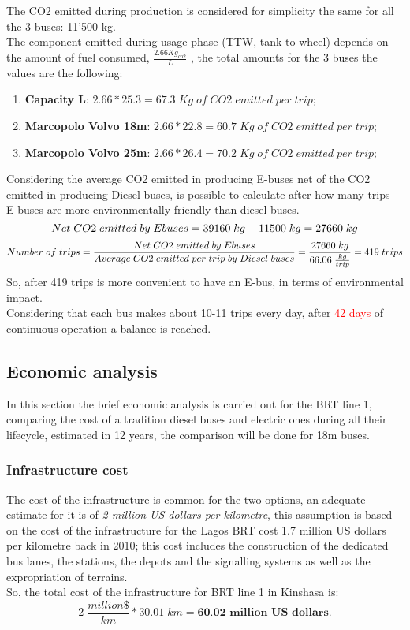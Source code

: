 \documentclass{article}
\begin{document}
The CO2 emitted during production is considered for simplicity the same for all the 3 buses: 11'500 kg.\\
The component emitted during usage phase (TTW, tank to wheel) depends on the amount of fuel consumed, $\frac{2.66 Kg_{co2}}{L}$ \cite{diesel}, the total amounts for the 3 buses the values are the following:
\begin{enumerate}
\item \textbf{Capacity L}: $2.66*25.3=67.3\;Kg\;of\;CO2\;emitted\;per\;trip;$
\item \textbf{Marcopolo Volvo 18m}: $2.66*22.8=60.7\;Kg\;of\;CO2\;emitted\;per\;trip;$
\item \textbf{Marcopolo Volvo 25m}: $2.66*26.4=70.2\;Kg\;of\;CO2\;emitted\;per\;trip;$
\end{enumerate}
Considering the average CO2 emitted in producing E-buses net of the CO2 emitted in producing Diesel buses, is possible to calculate after how many trips E-buses are more environmentally friendly than diesel buses.
\begin{equation}
Net\;CO2\;emitted\;by\;E\-buses=39160\;kg-11500\;kg=27660\;kg
\end{equation}
\begin{equation}
Number\;of\;trips=\frac{Net\;CO2\;emitted\;by\;E\-buses}{Average\;CO2\;emitted\;per\;trip\;by\;Diesel\;buses}=\frac{27660\;kg}{66.06\;\frac{kg}{trip}}=419\;trips
\end{equation}
So, after 419 trips is more convenient to have an E-bus, in terms of environmental impact.\\
Considering that each bus makes about 10-11 trips every day, after \textcolor{Red}{42 days} of continuous operation a balance is reached.
\newpage
\subsection{Economic analysis}
In this section the brief economic analysis is carried out for the BRT line 1, comparing the cost of a tradition diesel buses and electric ones during all their lifecycle, estimated in 12 years, the comparison will be done for 18m buses.
\subsubsection{Infrastructure cost}
The cost of the infrastructure is common for the two options, an adequate estimate for it is of \textit{2 million US dollars per kilometre}, this assumption is based on the cost of the infrastructure for the Lagos BRT cost 1.7 million US dollars per kilometre back in 2010; this cost includes the construction of the dedicated bus lanes, the stations, the depots and the signalling systems as well as the expropriation of terrains.\\
So, the total cost of the infrastructure for BRT line 1 in Kinshasa is:\\
\begin{equation}
 2\;\frac{million \$}{km}*30.01\;km=\textbf{60.02 million US dollars}.
 \end{equation}
\end{document}
